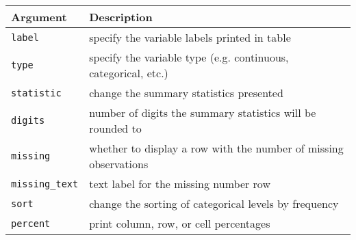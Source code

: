 \captionsetup[table]{labelformat=empty,skip=1pt}
\begin{longtable}{ll}
\toprule
Argument & Description \\ 
\midrule
\texttt{label} & specify the variable labels printed in table \\ 
\texttt{type} & specify the variable type (e.g. continuous, categorical, etc.) \\ 
\texttt{statistic} & change the summary statistics presented \\ 
\texttt{digits} & number of digits the summary statistics will be rounded to \\ 
\texttt{missing} & whether to display a row with the number of missing observations \\ 
\texttt{missing\_text} & text label for the missing number row \\ 
\texttt{sort} & change the sorting of categorical levels by frequency \\ 
\texttt{percent} & print column, row, or cell percentages \\ 
\bottomrule
\end{longtable}

